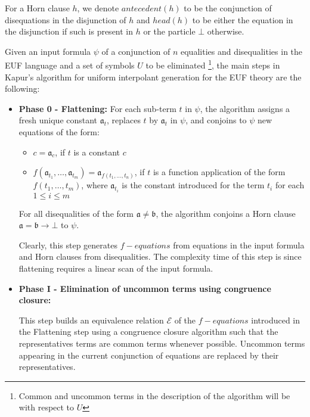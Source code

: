 For a Horn clause $h$,
we denote $antecedent(h)$ to be the conjunction of 
disequations in the disjunction of $h$ 
and $head(h)$ to be either the equation in the disjunction 
if such is present in $h$ 
or the particle $\bot$ otherwise.

Given an input formula $\psi$ of a conjunction of $n$ equalities and
disequalities in the EUF language and a set of symbols $U$ 
to be eliminated \footnote{Common and uncommon terms in the
description of the algorithm will be with respect to $U$}, 
the main steps in Kapur's algorithm for uniform 
interpolant generation for the EUF theory
are the following:

\begin{itemize}
  \item \textbf{Phase 0 - Flattening:} 
    For each sub-term $t$ in $\psi$, the algorithm assigns a 
    fresh unique constant $\mathfrak{a}_t$, replaces
    $t$ by $\mathfrak{a}_t$ in $\psi$, and 
    conjoins to $\psi$ new equations of the form:
    \begin{itemize}
      \item $c = \mathfrak{a}_c$, if $t$ is a constant $c$
      \item $f(\mathfrak{a}_{t_1}, \dots, \mathfrak{a}_{t_m}) 
        = \mathfrak{a}_{f(t_1, \dots, t_n)}$, if $t$ is a 
        function application of the form $f(t_1, \dots, t_m)$, 
        where $\mathfrak{a}_{t_i}$ is the constant introduced
        for the term $t_i$ for each $1 \leq i \leq m$
    \end{itemize}

    For all disequalities of the form
    $\mathfrak{a} \neq \mathfrak{b}$, the algorithm
    conjoins a Horn clause $\mathfrak{a} = \mathfrak{b} 
    \rightarrow \bot$ to $\psi$.

    Clearly, this step 
    generates $f-equations$ from equations in the input
    formula and Horn clauses
    from disequalities.
    The complexity time of this step is  since 
    flattening requires a linear scan of the input
    formula.

  \item \textbf{Phase I - Elimination of uncommon terms using 
    congruence closure:}

    This step builds an equivalence 
    relation $\mathcal{E}$ of the $f-equations$ introduced in the 
    Flattening step using a congruence closure algorithm such 
    that the representatives terms are common terms
    whenever possible. Uncommon terms appearing in 
    the current conjunction of 
    equations are replaced by their representatives.


\end{itemize}
